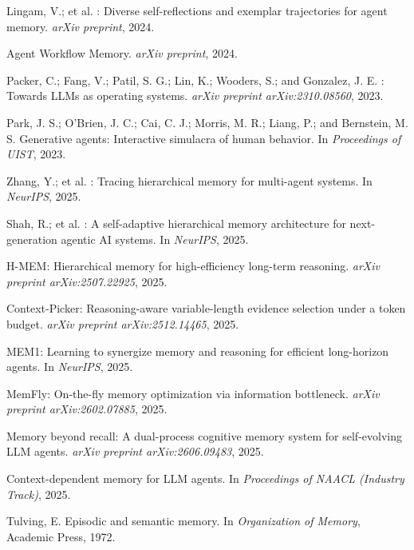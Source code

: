 \documentclass[letterpaper]{article} %
\begin{document}
\begin{thebibliography}{}
Lingam, V.; et al.
: Diverse self-reflections and exemplar trajectories for agent memory.
\newblock \emph{arXiv preprint}, 2024.

Agent Workflow Memory.
\newblock \emph{arXiv preprint}, 2024.

Packer, C.; Fang, V.; Patil, S. G.; Lin, K.; Wooders, S.; and Gonzalez, J. E.
: Towards {LLMs} as operating systems.
\newblock \emph{arXiv preprint arXiv:2310.08560}, 2023.

Park, J. S.; O'Brien, J. C.; Cai, C. J.; Morris, M. R.; Liang, P.; and Bernstein, M. S.
\newblock Generative agents: Interactive simulacra of human behavior.
\newblock In \emph{Proceedings of UIST}, 2023.

Zhang, Y.; et al.
: Tracing hierarchical memory for multi-agent systems.
\newblock In \emph{NeurIPS}, 2025.

Shah, R.; et al.
: A self-adaptive hierarchical memory architecture for next-generation agentic {AI} systems.
\newblock In \emph{NeurIPS}, 2025.

{H-MEM}: Hierarchical memory for high-efficiency long-term reasoning.
\newblock \emph{arXiv preprint arXiv:2507.22925}, 2025.

{Context-Picker}: Reasoning-aware variable-length evidence selection under a token budget.
\newblock \emph{arXiv preprint arXiv:2512.14465}, 2025.

{MEM1}: Learning to synergize memory and reasoning for efficient long-horizon agents.
\newblock In \emph{NeurIPS}, 2025.

{MemFly}: On-the-fly memory optimization via information bottleneck.
\newblock \emph{arXiv preprint arXiv:2602.07885}, 2025.

Memory beyond recall: A dual-process cognitive memory system for self-evolving {LLM} agents.
\newblock \emph{arXiv preprint arXiv:2606.09483}, 2025.

Context-dependent memory for {LLM} agents.
\newblock In \emph{Proceedings of NAACL (Industry Track)}, 2025.

Tulving, E.
\newblock Episodic and semantic memory.
\newblock In \emph{Organization of Memory}, Academic Press, 1972.


\end{thebibliography}
\end{document}
